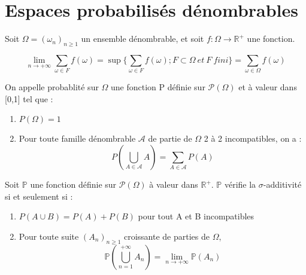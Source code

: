 \section{Espaces probabilisés dénombrables}
Soit $\Omega = (\omega_n)_{n \geqslant 1} $ un ensemble dénombrable, et soit $f: \Omega \rightarrow \mathbb{R}^{+} $ une fonction.

\[\lim_{n \rightarrow +\infty}{\sum_{\omega \in F} f(\omega)} = \sup \{ \sum_{\omega \in F} f(\omega) ; F \subset \Omega\ et\ F\ fini \} = \sum_{\omega \in \Omega} f(\omega) \]

\begin{Def}
On appelle probablité sur \begin{math} \Omega \end{math} une fonction P définie sur \begin{math}\mathcal{P}(\Omega)\end{math} et à valeur dans [0,1] tel que :
\begin{enumerate}
\item $P(\Omega)=1$
\item Pour toute famille dénombrable $\mathcal{A}$ de partie de $ \Omega $ 2 à 2 incompatibles, on a : \[P(\bigcup_{A \in \mathcal{A}} A)=\sum_{A \in \mathcal{A}} P(A) \]
\end{enumerate}
\end{Def}

\begin{Prop}
Soit $\mathbb{P}$ une fonction définie sur $\mathcal{P}(\Omega)$ à valeur dans $\mathbb{R}^{+}$. $\mathbb{P}$ vérifie la $\sigma$-additivité si et seulement si :
\begin{enumerate}
\item $P(A \cup B) = P(A) + P(B)$ pour tout A et B incompatibles
\item Pour toute suite $(A_n)_{n \geqslant 1}$ croissante de parties de $\Omega$, \[\mathbb{P}(\bigcup_{n=1}^{+\infty} A_n) = \lim_{n \rightarrow +\infty} \mathbb{P}(A_n)\]
\end{enumerate}
\end{Prop}

